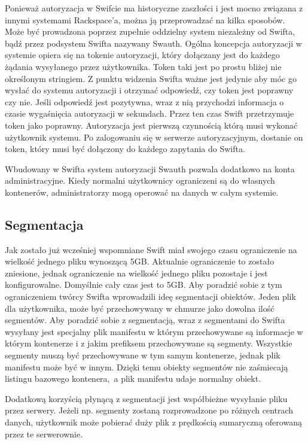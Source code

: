 Ponieważ autoryzacja w Swifcie ma historyczne zaszłości i jest mocno związana z innymi systemami Rackspace'a, można ją przeprowadzać na kilka sposobów. Może być prowadzona poprzez zupełnie oddzielny system niezależny od Swifta, bądź przez podsystem Swifta nazywany Swauth. Ogólna koncepcja autoryzacji w systemie opiera się na tokenie autoryzacji, który dołączany jest do każdego żądania wysyłanego przez użytkownika. Token taki jest po prostu bliżej nie określonym stringiem. Z punktu widzenia Swifta ważne jest jedynie aby móc go wysłać do systemu autoryzacji i otrzymać odpowiedź, czy token jest poprawny czy nie. Jeśli odpowiedź jest pozytywna, wraz z nią przychodzi informacja o czasie wygaśnięcia autoryzacji w sekundach. Przez ten czas Swift przetrzymuje token jako poprawny. Autoryzacja jest pierwszą czynnością którą musi wykonać użytkownik systemu. Po zalogowaniu się w serwerze autoryzacyjnym, dostanie on token, który musi być dołączony do każdego zapytania do Swifta.

Wbudowany w Swifta system autoryzacji Swauth pozwala dodatkowo na konta administracyjne. Kiedy normalni użytkownicy ograniczeni są do własnych kontenerów, administratorzy mogą operować na danych w całym systemie.

\subsection{Segmentacja}\label{sec:segmentacja}

Jak zostało już wcześniej wspomniane Swift miał swojego czasu ograniczenie na wielkość jednego pliku wynoszącą 5GB. Aktualnie ograniczenie to zostało zniesione, jednak ograniczenie na wielkość jednego pliku pozostaje i jest konfigurowalne. Domyślnie cały czas jest to 5GB. Aby poradzić sobie z tym ograniczeniem twórcy Swifta wprowadzili ideę segmentacji obiektów. Jeden plik dla użytkownika, może być przechowywany w chmurze jako dowolna ilość segmentów. Aby poradzić sobie z segmentacją, wraz z segmentami do Swifta wysyłany jest specjalny plik manifestu w którym przechowywane są informacje w którym kontenerze i z jakim prefiksem przechowywane są segmenty. Wszystkie segmenty muszą być przechowywane w tym samym kontenerze, jednak plik manifestu może być w innym. Dzięki temu obiekty segmentów nie zaśmiecają listingu bazowego kontenera,~a plik manifestu udaje normalny obiekt.

Dodatkową korzyścią płynącą z segmentacji jest współbieżne wysyłanie pliku przez serwery. Jeżeli np. segmenty zostaną rozprowadzone po różnych centrach danych, użytkownik może pobierać duży plik z prędkością sumaryczną oferowaną przez te serwerownie.

